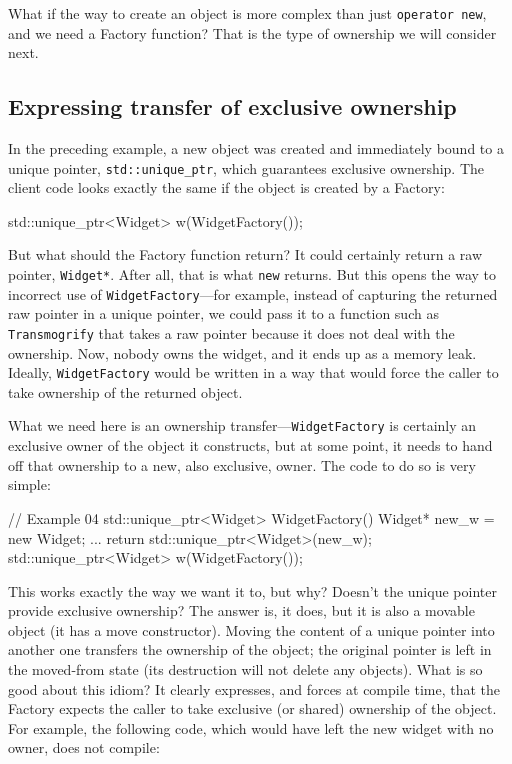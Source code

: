 What if the way to create an object is more complex than just \texttt{operator\ new}, and we need a Factory function? That is the type of ownership we will consider next.

\subsection{Expressing transfer of exclusive ownership}

In the preceding example, a new object was created and immediately bound to a unique pointer, \texttt{std::unique\_ptr}, which guarantees exclusive ownership. The client code looks exactly the same if the object is created by a Factory:

\begin{code}
std::unique_ptr<Widget> w(WidgetFactory());
\end{code}

But what should the Factory function return? It could certainly return a raw pointer, \texttt{Widget*}. After all, that is what \texttt{new} returns. But this opens the way to incorrect use of \texttt{WidgetFactory}---for example, instead of capturing the returned raw pointer in a unique pointer, we could pass it to a function such as \texttt{Transmogrify} that takes a raw pointer because it does not deal with the ownership. Now, nobody owns the widget, and it ends up as a memory leak. Ideally, \texttt{WidgetFactory} would be written in a way that would force the caller to take ownership of the returned object.

What we need here is an ownership transfer---\texttt{WidgetFactory} is certainly an exclusive owner of the object it constructs, but at some point, it needs to hand off that ownership to a new, also exclusive, owner. The code to do so is very simple:

\begin{code}
// Example 04
std::unique_ptr<Widget> WidgetFactory() {
  Widget* new_w = new Widget;
    ...
  return std::unique_ptr<Widget>(new_w);
}
std::unique_ptr<Widget> w(WidgetFactory());
\end{code}

This works exactly the way we want it to, but why? Doesn't the unique pointer provide exclusive ownership? The answer is, it does, but it is also a movable object (it has a move constructor). Moving the content of a unique pointer into another one transfers the ownership of the object; the original pointer is left in the moved-from state (its destruction will not delete any objects). What is so good about this idiom? It clearly expresses, and forces at compile time, that the Factory expects the caller to take exclusive (or shared) ownership of the object. For example, the following code, which would have left the new widget with no owner, does not compile:


